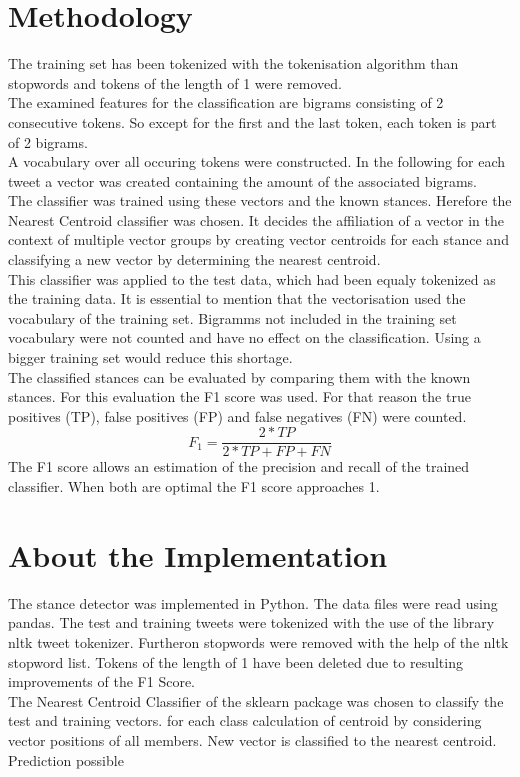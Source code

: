 \documentclass[a4paper,12pt,twoside]{article}
\begin{document}
\section{Methodology}
The training set has been tokenized with the tokenisation algorithm than stopwords and tokens of the length of 1 were removed. \\
The examined features for the classification are bigrams consisting of 2 consecutive tokens. So except for the first and the last token, each token is part of 2 bigrams.\\
A vocabulary over all occuring tokens were constructed. In the following for each tweet a vector was created containing the amount of the associated bigrams.\\
The classifier was trained using these vectors and the known stances. Herefore the Nearest Centroid classifier was chosen. It decides the affiliation of a vector in the context of multiple vector groups by creating vector centroids for each stance and classifying a new vector by determining the nearest centroid.\\
This classifier was applied to the test data, which had been equaly tokenized as the training data. It is essential to mention that the vectorisation used the vocabulary of the training set. Bigramms not included in the training set vocabulary were not counted and have no effect on the classification. Using a bigger training set would reduce this shortage. \\
The classified stances can be evaluated by comparing them with the known stances. For this evaluation the F1 score was used. For that reason the true positives (TP), false positives (FP) and false negatives (FN) were counted.
\begin{equation}
F_1 = \frac{2*TP}{ 2*TP + FP + FN}
\end{equation}
The F1 score allows an estimation of the precision and recall of the trained classifier. When both are optimal the F1 score approaches 1.

\section{About the Implementation}
The stance detector was implemented in Python. The data files were read using pandas. The test and training tweets were tokenized with the use of the library nltk tweet tokenizer. Furtheron stopwords were removed with the help of the nltk stopword list.
Tokens of the length of 1 have been deleted due to resulting improvements of the F1 Score. \\
The Nearest Centroid Classifier  of the sklearn package was chosen to classify the test and training vectors.
for each class calculation of centroid by considering vector positions of all members.
New vector is classified to the nearest centroid. Prediction possible
\end{document}

